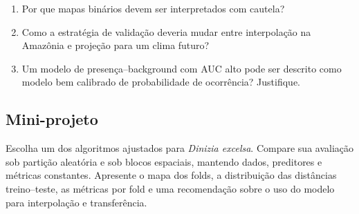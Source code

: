 \begin{enumerate}[resume]
	\item Por que mapas binários devem ser interpretados com cautela?
	\item Como a estratégia de validação deveria mudar entre interpolação na
	Amazônia e projeção para um clima futuro?
	\item Um modelo de presença--background com AUC alto pode ser descrito como
	modelo bem calibrado de probabilidade de ocorrência? Justifique.
\end{enumerate}

\subsection*{Mini-projeto}

Escolha um dos algoritmos ajustados para \textit{Dinizia excelsa}. Compare sua
avaliação sob partição aleatória e sob blocos espaciais, mantendo dados,
preditores e métricas constantes. Apresente o mapa dos folds, a distribuição das
distâncias treino--teste, as métricas por fold e uma recomendação sobre o uso do
modelo para interpolação e transferência.

